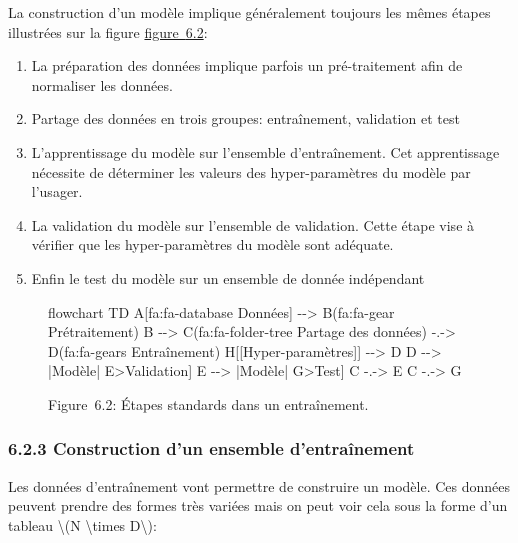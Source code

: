 \documentclass[
]{article}
\newenvironment{Shaded}{}{}
\newcommand{\NormalTok}[1]{#1}
\begin{document}
La construction d'un modèle implique généralement toujours les mêmes
étapes illustrées sur la figure \hyperref[fig-pipeline]{figure~{6.2}}:

\begin{enumerate}
\def\labelenumi{\arabic{enumi}.}
\item
  La préparation des données implique parfois un pré-traitement afin de
  normaliser les données.
\item
  Partage des données en trois groupes: entraînement, validation et test
\item
  L'apprentissage du modèle sur l'ensemble d'entraînement. Cet
  apprentissage nécessite de déterminer les valeurs des hyper-paramètres
  du modèle par l'usager.
\item
  La validation du modèle sur l'ensemble de validation. Cette étape vise
  à vérifier que les hyper-paramètres du modèle sont adéquate.
\item
  Enfin le test du modèle sur un ensemble de donnée indépendant
\end{enumerate}

\label{fig-pipeline}
\begin{figure}
\centering
\begin{Shaded}
\begin{Highlighting}[]
\NormalTok{flowchart TD}
\NormalTok{    A[fa:fa{-}database Données] {-}{-}\textgreater{} B(fa:fa{-}gear Prétraitement)}
\NormalTok{    B {-}{-}\textgreater{} C(fa:fa{-}folder{-}tree Partage des données) {-}.{-}\textgreater{} D(fa:fa{-}gears Entraînement)}
\NormalTok{    H[[Hyper{-}paramètres]] {-}{-}\textgreater{} D}
\NormalTok{    D {-}{-}\textgreater{} |Modèle| E\textgreater{}Validation]}
\NormalTok{    E {-}{-}\textgreater{} |Modèle| G\textgreater{}Test]}
\NormalTok{    C {-}.{-}\textgreater{} E}
\NormalTok{    C {-}.{-}\textgreater{} G}
\end{Highlighting}
\end{Shaded}
\caption{Figure~6.2: Étapes standards dans un entraînement.}
\end{figure}

\label{sec-05.02.02}
\subsubsection{\texorpdfstring{{6.2.3} Construction d'un ensemble
d'entraînement}{6.2.3 Construction d'un ensemble d'entraînement}}\label{construction-dun-ensemble-dentrauxeenement}

Les données d'entraînement vont permettre de construire un modèle. Ces
données peuvent prendre des formes très variées mais on peut voir cela
sous la forme d'un tableau {\textbackslash(N \textbackslash times
D\textbackslash)}:
\end{document}
